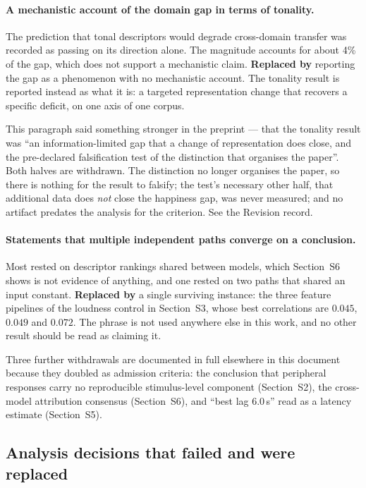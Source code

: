 \paragraph{A mechanistic account of the domain gap in terms of tonality.}
The prediction that tonal descriptors would degrade cross-domain transfer was recorded
as passing on its direction alone. The magnitude accounts for about 4\% of the gap,
which does not support a mechanistic claim. \textbf{Replaced by} reporting the gap as a
phenomenon with no mechanistic account. The tonality result is reported instead as what
it is: a targeted representation change that recovers a specific deficit, on one axis of
one corpus.

This paragraph said something stronger in the preprint --- that the tonality result was
``an information-limited gap that a change of representation does close, and the
pre-declared falsification test of the distinction that organises the paper''. Both
halves are withdrawn. The distinction no longer organises the paper, so there is nothing
for the result to falsify; the test's necessary other half, that additional data does
\emph{not} close the happiness gap, was never measured; and no artifact predates the
analysis for the criterion. See the Revision record.

\paragraph{Statements that multiple independent paths converge on a conclusion.}
Most rested on descriptor rankings shared between models, which Section~S6 shows is not
evidence of anything, and one rested on two paths that shared an input constant.
\textbf{Replaced by} a single surviving instance: the three feature pipelines of the
loudness control in Section~S3, whose best correlations are $0.045$, $0.049$ and
$0.072$. The phrase is not used anywhere else in this work, and no other result should
be read as claiming it.

Three further withdrawals are documented in full elsewhere in this document because
they doubled as admission criteria: the conclusion that peripheral responses carry no
reproducible stimulus-level component (Section~S2), the cross-model attribution
consensus (Section~S6), and ``best lag $6.0$\,s'' read as a latency estimate
(Section~S5).

\subsection{Analysis decisions that failed and were replaced}

